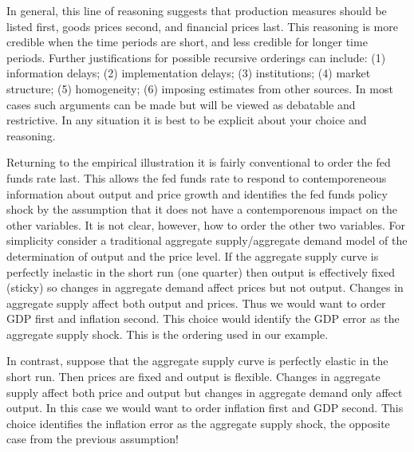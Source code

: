 \documentclass[10pt]{article}
\begin{document}
In general, this line of reasoning suggests that production measures should be listed first, goods prices second, and financial prices last. This reasoning is more credible when the time periods are short, and less credible for longer time periods. Further justifications for possible recursive orderings can include: (1) information delays; (2) implementation delays; (3) institutions; (4) market structure; (5) homogeneity; (6) imposing estimates from other sources. In most cases such arguments can be made but will be viewed as debatable and restrictive. In any situation it is best to be explicit about your choice and reasoning.

Returning to the empirical illustration it is fairly conventional to order the fed funds rate last. This allows the fed funds rate to respond to contemporeneous information about output and price growth and identifies the fed funds policy shock by the assumption that it does not have a contemporenous impact on the other variables. It is not clear, however, how to order the other two variables. For simplicity consider a traditional aggregate supply/aggregate demand model of the determination of output and the price level. If the aggregate supply curve is perfectly inelastic in the short run (one quarter) then output is effectively fixed (sticky) so changes in aggregate demand affect prices but not output. Changes in aggregate supply affect both output and prices. Thus we would want to order GDP first and inflation second. This choice would identify the GDP error as the aggregate supply shock. This is the ordering used in our example.

In contrast, suppose that the aggregate supply curve is perfectly elastic in the short run. Then prices are fixed and output is flexible. Changes in aggregate supply affect both price and output but changes in aggregate demand only affect output. In this case we would want to order inflation first and GDP second. This choice identifies the inflation error as the aggregate supply shock, the opposite case from the previous assumption!
\end{document}

